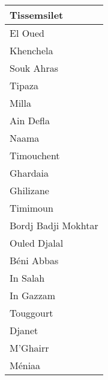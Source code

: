 \begin{table}[!ht]
\begin{tabular}{|l|}
        Tissemsilet \\ \hline
        El Oued \\ \hline
        Khenchela \\ \hline
        Souk Ahras \\ \hline
        Tipaza \\ \hline
        Milla \\ \hline
        Ain Defla \\ \hline
        Naama \\ \hline
        Timouchent \\ \hline
        Ghardaia \\ \hline
        Ghilizane \\ \hline
        Timimoun \\ \hline
        Bordj Badji Mokhtar \\ \hline
        Ouled Djalal \\ \hline
        Béni Abbas \\ \hline
        In Salah \\ \hline
        In Gazzam \\ \hline
        Touggourt \\ \hline
        Djanet \\ \hline
        M'Ghairr \\ \hline
        Méniaa \\ \hline
    \end{tabular}
\end{table}
